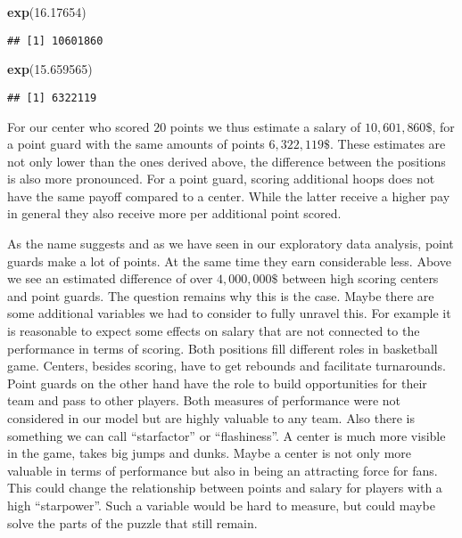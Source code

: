 \documentclass[
]{book}
\newenvironment{Shaded}{\begin{snugshade}}{\end{snugshade}}
\newcommand{\FloatTok}[1]{\textcolor[rgb]{0.00,0.00,0.81}{#1}}
\newcommand{\FunctionTok}[1]{\textcolor[rgb]{0.13,0.29,0.53}{\textbf{#1}}}
\newcommand{\NormalTok}[1]{#1}
\begin{document}
\begin{Shaded}
\begin{Highlighting}[]
\FunctionTok{exp}\NormalTok{(}\FloatTok{16.17654}\NormalTok{)}
\end{Highlighting}
\end{Shaded}

\begin{verbatim}
## [1] 10601860
\end{verbatim}

\begin{Shaded}
\begin{Highlighting}[]
\FunctionTok{exp}\NormalTok{(}\FloatTok{15.659565}\NormalTok{)}
\end{Highlighting}
\end{Shaded}

\begin{verbatim}
## [1] 6322119
\end{verbatim}

For our center who scored \(20\) points we thus estimate a salary of
\(10,601,860\$\), for a point guard with the same amounts of points \(6,322,119\$\).
These estimates are not only lower than the ones derived above, the difference
between the positions is also more pronounced. For a point guard, scoring
additional hoops does not have the same payoff compared to a center. While the
latter receive a higher pay in general they also receive more per additional
point scored.

As the name suggests and as we have seen in our exploratory data analysis,
point guards make a lot of points. At the same time they earn considerable less.
Above we see an estimated difference of over \(4,000,000\$\) between high scoring
centers and point guards. The question remains why this is the case.
Maybe there are some additional variables we had to consider to fully unravel
this.
For example it is reasonable to expect some effects on salary that are not
connected to the performance in terms of scoring. Both positions fill different
roles in basketball game. Centers, besides scoring, have to get rebounds and
facilitate turnarounds. Point guards on the other hand have the role to build
opportunities for their team and pass to other players. Both measures of
performance were not considered in our model but are highly valuable to any team.
Also there is something we can call ``starfactor'' or ``flashiness''. A center is
much more visible in the game, takes big jumps and dunks. Maybe a center is not
only more valuable in terms of performance but also in being an attracting force
for fans. This could change the relationship between points and salary for
players with a high ``starpower''. Such a variable would be hard to measure,
but could maybe solve the parts of the puzzle that still remain.
\end{document}
